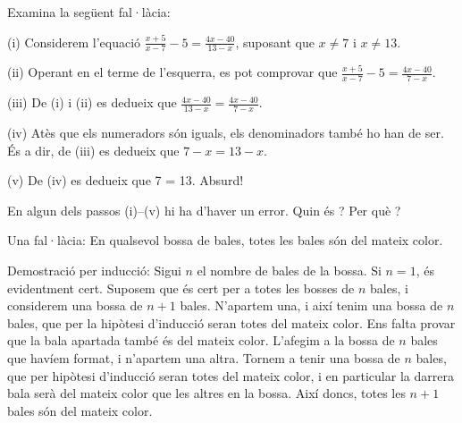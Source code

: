 \begin{enumerate}
\begin{enumerate}
{}
\end{enumerate}
\feedback

\pregunta Examina la següent fal·làcia:

(i) Considerem l'equació $\frac{x+5}{x-7}-5=\frac{4x-40}{13-x}$, suposant
que $x\neq7$ i $x\neq13$.

(ii) Operant en el terme de l'esquerra, es pot comprovar que $\frac{x+5}%
{x-7}-5=\frac{4x-40}{7-x}$.

(iii) De (i) i (ii) es dedueix que $\frac{4x-40}{13-x}=\frac{4x-40}{7-x}$.

(iv) Atès que els numeradors són iguals, els denominadors també ho
han de ser. És a dir, de (iii) es dedueix que $7-x=13-x$.

(v) De (iv) es dedueix que 7 = 13. Absurd!

En algun dels passos (i)--(v) hi ha d'haver un error. Quin és ? Per
què ?

\begin{enumerate}
\end{enumerate}
\feedback

\pregunta Una fal·làcia: En qualsevol bossa de bales, totes
les bales són del mateix color.

Demostració per inducció: Sigui $n$ el nombre de bales de la bossa. Si
$n=1$, és evidentment cert. Suposem que és cert per a totes les bosses
de $n$ bales, i considerem una bossa de $n+1$ bales. N'apartem una, i
així tenim una bossa de $n$ bales, que per la hipòtesi d'inducció
seran totes del mateix color. Ens falta provar que la bala apartada també
és del mateix color. L'afegim a la bossa de $n$ bales que havíem
format, i n'apartem una altra. Tornem a tenir una bossa de $n$ bales, que per
hipòtesi d'inducció seran totes del mateix color, i en particular la
darrera bala serà del mateix color que les altres en la bossa. Així
doncs, totes les $n+1$ bales són del mateix color.


\end{enumerate}
